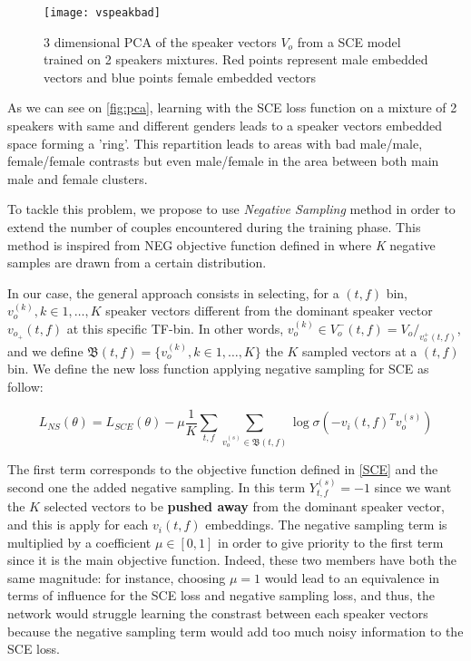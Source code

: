 \documentclass[master, tikz, final,11pt, dvipdfmx]{iscs-thesis}
\begin{document}
\begin{figure}
\centering
\texttt{[image: vspeakbad]}
\caption[3 dimensional PCA of the speaker vectors $V_o$ from a SCE model trained on 2 speakers mixtures]{3 dimensional PCA of the speaker vectors $V_o$ from a SCE model trained on 2 speakers mixtures. Red points represent male embedded vectors and blue points female embedded vectors}
\label{fig:pca} 
\end{figure}

As we can see on \autoref{fig:pca}, learning with the SCE loss function on a mixture of 2 speakers with same and different genders leads to a speaker vectors embedded space forming a 'ring'. This repartition leads to areas with bad male/male, female/female contrasts but even male/female in the area between both main male and female clusters. 

To tackle this problem, we propose to use \textit{Negative Sampling} method in order to extend the number of couples encountered during the training phase. This method is inspired from NEG objective function defined in \cite{NS} where \textit{K} negative samples are drawn from a certain distribution. 

In our case, the general approach consists in selecting, for a $(t,f)$ bin, $v_o^{(k)}, k \in 1,\dotsc,K$ speaker vectors different from the dominant speaker vector $v_{o_{+}}(t,f)$ at this specific TF-bin. In other words, $v_o^{(k)} \in V_o^-(t,f) = V_o/_{v_o^+(t,f)}$, and we define $\mathfrak{B}(t,f) = \{v_o^{(k)}, k \in 1,\dotsc,K\}$ the $K$ sampled vectors at a $(t,f)$ bin. We define the new loss function applying negative sampling for SCE as follow:

\[L_{NS}(\theta) = L_{SCE}(\theta) - \mu \frac{1}{K} \sum_{t,f} \sum_{v_o^{(s)} \in \mathfrak{B}(t,f)} \log \sigma(- v_i(t,f)^{T} v_o^{(s)}) \]

The first term corresponds to the objective function defined in \autoref{SCE} and the second one the added negative sampling. In this term $Y_{t,f}^{(s)} = -1$ since we want the $K$ selected vectors to be \textbf{pushed away} from the dominant speaker vector, and this is apply for each $v_i(t,f)$ embeddings. The negative sampling term is multiplied by a coefficient $\mu \in[0,1]$ in order to give priority to the first term since it is the main objective function. Indeed, these two members have both the same magnitude: for instance, choosing $\mu = 1$ would lead to an equivalence in terms of influence for the SCE loss and negative sampling loss, and thus, the network would struggle learning the constrast between each speaker vectors because the negative sampling term would add too much noisy information to the SCE loss. 
\end{document}
